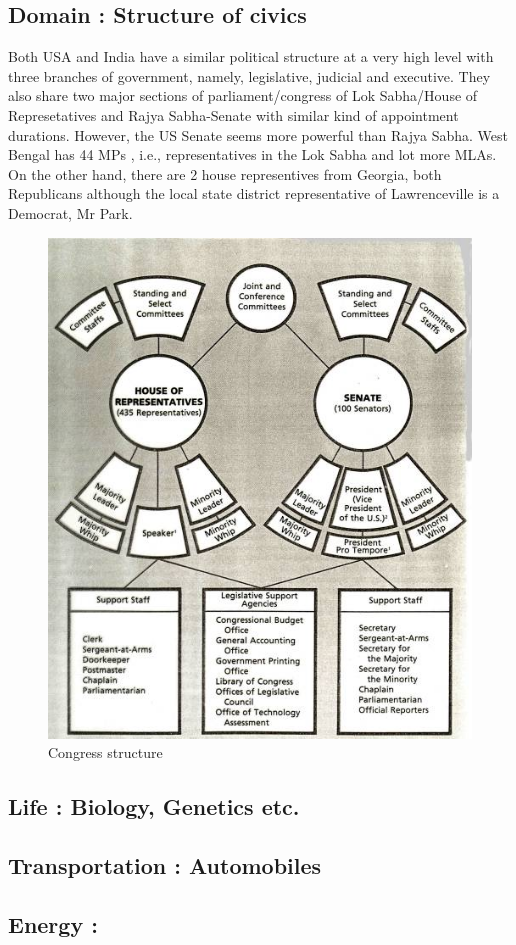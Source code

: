 \documentclass[11pt]{amsart}
\begin{document}
\subsection {Domain : Structure of civics}
Both USA and India have a similar political structure at a very high level with three branches of government, namely, legislative, judicial and executive. They also share two major sections of parliament/congress of Lok Sabha/House of Represetatives and Rajya Sabha-Senate with similar kind of appointment durations. However, the US Senate seems more powerful than Rajya Sabha. West Bengal has 44 MPs , i.e., representatives in the Lok Sabha and lot more MLAs. On the other hand, there are 2 house representives from Georgia, both Republicans although the local state district representative of Lawrenceville is a Democrat, Mr Park. 
\begin{figure}[H]
\centering
  \includegraphics[scale=0.65]{congress.jpg}
  \caption{Congress structure}
  \label{fig:congress}
\end{figure}


\subsection{Life : Biology, Genetics etc.}
\subsection{Transportation : Automobiles}
\subsection{Energy : }
\end{document}
